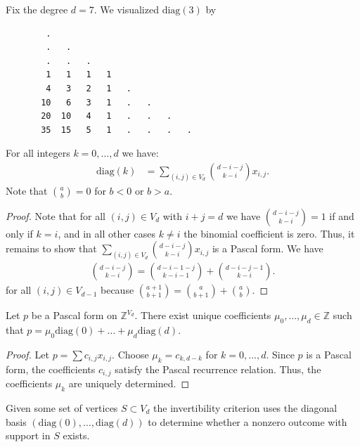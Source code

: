 \begin{example}
    Fix the degree \( d = 7 \). We visualized \( \mathrm{diag}(3) \) by
    \begin{verbatim}
        .
        .   .
        .   .   .
        1   1   1   1
        4   3   2   1   .
       10   6   3   1   .   .
       20  10   4   1   .   .   . 
       35  15   5   1   .   .   .   .
    \end{verbatim}
\end{example}

\begin{proposition}
    For all integers \( k = 0, \dots, d \) we have:
    \begin{align*}
        \mathrm{diag}(k)  &= \sum_{(i,j) \in V_d}\binom{d - i - j}{k-i} x_{i,j}.
    \end{align*} 
    Note that \( \binom{a}{b} = 0 \) for \( b < 0 \) or \( b > a \).
\end{proposition}

\begin{proof}
    Note that for all \( (i,j) \in V_d \) with \( i+j = d \) we have \( \binom{d - i - j}{k-i} = 1 \) if and only if \( k= i \), and in all other cases \( k \neq i \) the binomial coefficient is zero. Thus, it remains to show that \( \sum_{(i,j) \in V_d}\binom{d - i - j}{k-i} x_{i,j} \) is a Pascal form. We have 
    \begin{align*}
        \binom{d-i-j}{k-i} = \binom{d-i-1-j}{k-i-1} + \binom{d-i-j-1}{k-i}.
    \end{align*}
    for all \( (i,j) \in V_{d-1} \) because \( \binom{a+1}{b+1} = \binom{a}{b+1} + \binom{a}{b}\).
\end{proof}

\begin{proposition}
    Let \( p \) be a Pascal form on \( \mathbb Z^{V_d} \). There exist unique coefficients \( \mu_0, \dots, \mu_d \in \mathbb{Z} \) such that 
    \( p = \mu_0 \mathrm{diag}(0) + \dots + \mu_d \mathrm{diag}(d) \).
\end{proposition}

\begin{proof}
    Let \( p = \sum c_{i,j}x_{i,j} \). Choose \( \mu_k = c_{k,d-k} \) for \( k=0, \dots, d \). Since \( p \) is a Pascal form, the coefficients \( c_{i,j} \) satisfy the Pascal recurrence relation. Thus, the coefficients \( \mu_k \) are uniquely determined.
\end{proof}

Given some set of vertices \( S \subset V_d \) the invertibility criterion uses the diagonal basis \( (\mathrm{diag}(0), \dots, \mathrm{diag}(d)) \) to determine whether a nonzero outcome with support in \( S \) exists.

